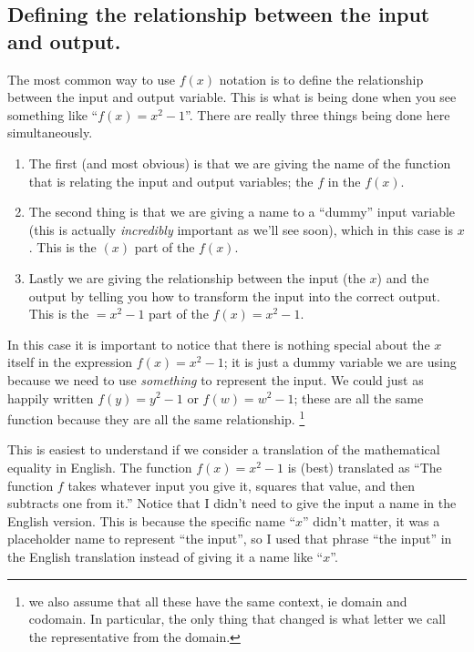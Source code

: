 \documentclass{ximera}
\begin{document}
    \subsection*{Defining the relationship between the input and output.}
        The most common way to use $f(x)$ notation is to define the relationship between the input and output variable. This is what is being done when you see something like ``$f(x) = x^2 - 1$''. There are really three things being done here simultaneously. 
        \begin{enumerate}[label=\alph*)]
            \item The first (and most obvious) is that we are giving the name of the function that is relating the input and output variables; the $f$ in the $f(x)$. 
            \item The second thing is that we are giving a name to a ``dummy'' input variable (this is actually \textit{incredibly} important as we'll see soon), which in this case is $x$. This is the $(x)$ part of the $f(x)$.
            \item Lastly we are giving the relationship between the input (the $x$) and the output by telling you how to transform the input into the correct output. This is the $= x^2 - 1$ part of the $f(x) = x^2 - 1$. 
        \end{enumerate}
        In this case it is important to notice that there is nothing special about the $x$ itself in the expression $f(x) = x^2 - 1$; it is just a dummy variable we are using because we need to use \textit{something} to represent the input. We could just as happily written $f(y) = y^2 - 1$ or $f(w) = w^2 - 1$; these are all the same function because they are all the same relationship.%
        \footnote{we also assume that all these have the same context, ie domain and codomain. In particular, the only thing that changed is what letter we call the representative from the domain.}%
        
        This is easiest to understand if we consider a translation of the mathematical equality in English. The function $f(x) = x^2 - 1$ is (best) translated as ``The function $f$ takes whatever input you give it, squares that value, and then subtracts one from it.'' Notice that I didn't need to give the input a name in the English version. This is because the specific name ``$x$'' didn't matter, it was a placeholder name to represent ``the input'', so I used that phrase ``the input'' in the English translation instead of giving it a name like ``$x$''.
        
\end{document}
